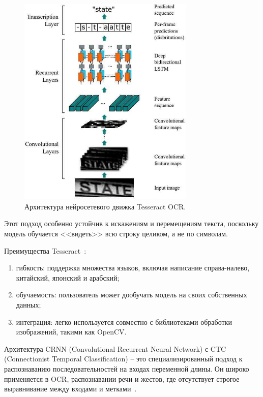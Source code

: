 \begin{figure}[H]
    \centering
    \includegraphics[width=0.75\textwidth]{
        imgs/theory/TesseractOCR.png
    }
    \caption{Архитектура нейросетевого движка Tesseract OCR.}
    \label{fig:tesseract}
\end{figure}
\vspace{-0.85cm}

Этот подход особенно устойчив к искажениям и перемещениям текста, поскольку 
модель обучается <<видеть>> всю строку целиком, а не по символам.

Преимущества Tesseract~\cite{tesseractbook}:

\begin{enumerate}
    \item гибкость: поддержка множества языков, включая написание справа-налево, 
    китайский, японский и арабский;
    \item обучаемость: пользователь может дообучать модель на своих собственных 
    данных;
    \item интеграция: легко используется совместно с библиотеками обработки 
    изображений, такими как OpenCV.
\end{enumerate}

Архитектура CRNN (Convolutional Recurrent Neural Network) с CTC (Connectionist 
Temporal Classification) -- это специализированный подход к распознаванию 
последовательностей на входах переменной длины. Он широко применяется в OCR, 
распознавании речи и жестов, где отсутствует строгое выравнивание между входами 
и метками~\cite{crnnbook}.

